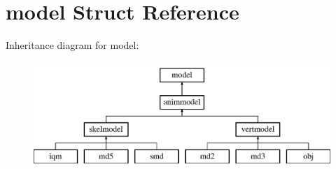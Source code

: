 \hypertarget{structmodel}{}\section{model Struct Reference}
\label{structmodel}
Inheritance diagram for model\+:\begin{figure}[H]
\begin{center}
\leavevmode
\includegraphics[height=4.000000cm]{structmodel}
\end{center}
\end{figure}
